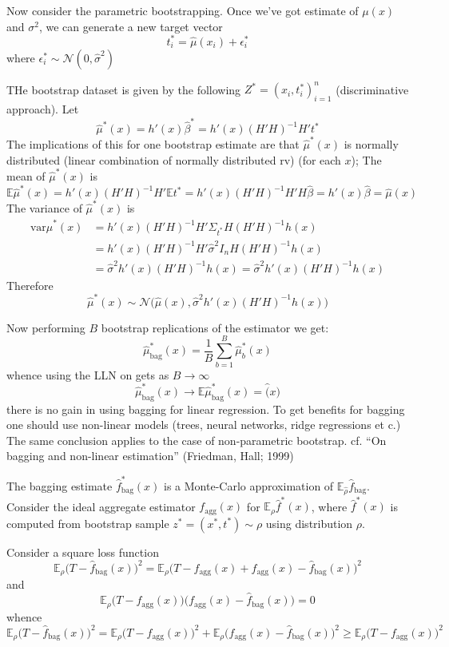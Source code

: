 \documentclass[a4paper]{article}
\newcommand{\Ncal}{\mathcal{N}}
\newcommand{\ex}{\mathbb{E}}
\newcommand{\var}[0]{{\text{var}}}
\begin{document}
Now consider the parametric bootstrapping. Once we've got estimate of $\mu(x)$ and $\sigma^2$, we can generate a new target vector
\[t^*_i = \hat{\mu}(x_i) + \epsilon^*_i\]
where $\epsilon^*_i\sim \Ncal(0, \hat{\sigma}^2)$

THe bootstrap dataset is given by the following $Z^* = (x_i, t^*_i)_{i=1}^n$ (discriminative approach).
Let 
\[
\hat{\mu}^*(x)
= h'(x)\hat{\beta}^*
= h'(x)(H'H)^{-1}H't^*
\]
The implications of this for one bootstrap estimate are that $\hat{\mu}^*(x)$ is
normally distributed (linear combination of normally distributed rv) (for each $x$);
The mean of $\hat{\mu}^*(x)$ is 
	\[
	\ex\hat{\mu}^*(x)
	= h'(x) (H'H)^{-1}H'\ex t^*
	= h'(x) (H'H)^{-1}H'H\hat{\beta}
	= h'(x) \hat{\beta}
	= \hat{\mu}(x)
	\]
The variance of $\hat{\mu}^*(x)$ is
\begin{align*}
	\var\hat{\mu}^*(x)
	&= h'(x) (H'H)^{-1}H' \Sigma_{t^*} H(H'H)^{-1} h(x)\\
	&= h'(x) (H'H)^{-1}H' \hat{\sigma}^2 I_n H(H'H)^{-1} h(x)\\
	&= \hat{\sigma}^2 h'(x) (H'H)^{-1} h(x)
		= \hat{\sigma}^2 h'(x) (H'H)^{-1} h(x)
\end{align*}
Therefore
\[\hat{\mu}^*(x) \sim \Ncal\bigl(\hat{\mu}(x), \hat{\sigma}^2 h'(x) (H'H)^{-1} h(x)\bigr)\]

Now performing $B$ bootstrap replications of the estimator we get:
\[
\hat{\mu}^*_{\text{bag}}(x)
= \frac{1}{B} \sum_{b=1}^B \hat{\mu}^*_b(x)
\]
whence using the LLN on gets as $B\to \infty$
\[
\hat{\mu}^*_{\text{bag}}(x) \to \ex\hat{\mu}^*_{\text{bag}}(x) = \hat(x)
\]
there is no gain in using bagging for linear regression. To get benefits for bagging
one should use non-linear models (trees, neural networks, ridge regressions et c.)
The same conclusion applies to the case of non-parametric bootstrap. cf. ``On bagging
and non-linear estimation'' (Friedman, Hall; 1999)

The bagging estimate $\hat{f}_{\text{bag}}^*(x)$ is a Monte-Carlo approximation of $\ex_{\hat{\rho}}\hat{f}_{\text{bag}}$. Consider the ideal aggregate estimator $f_{\text{agg}}(x)$ for $\ex_\rho\hat{f}^*(x)$, where 
$\hat{f}^*(x)$ is computed from bootstrap sample $z^* = (x^*, t^*)\sim \rho$
using distribution $\rho$.

Consider a square loss function
\[
\ex_\rho \bigl( T-\hat{f}_{\text{bag}}(x)\bigr)^2
= 
\ex_\rho \bigl( T-f_{\text{agg}}(x)+f_{\text{agg}}(x)-\hat{f}_{\text{bag}}(x)\bigr)^2
\]
and
\[
\ex_\rho \bigl( T-f_{\text{agg}}(x)\bigr)\bigl( f_{\text{agg}}(x) - \hat{f}_{\text{bag}}(x)\bigr)
= 0
\]
whence
\[
\ex_\rho \bigl( T-\hat{f}_{\text{bag}}(x)\bigr)^2
= \ex_\rho \bigl( T-f_{\text{agg}}(x)\bigr)^2 + 
\ex_\rho \bigl( f_{\text{agg}}(x) - \hat{f}_{\text{bag}}(x)\bigr)^2
\geq \ex_\rho \bigl( T-f_{\text{agg}}(x)\bigr)^2
\]
\end{document}
